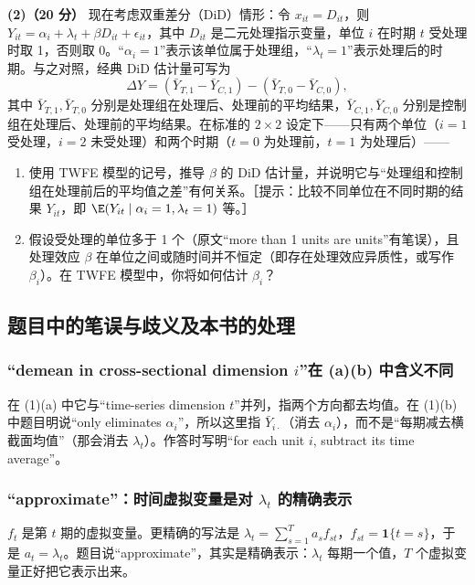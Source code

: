 \textbf{(2)（20 分）} 现在考虑双重差分（DiD）情形：令 $x_{it}=D_{it}$，则 $Y_{it}=\alpha_i+\lambda_t+\beta D_{it}+\epsilon_{it}$，其中 $D_{it}$ 是二元处理指示变量，单位 $i$ 在时期 $t$ 受处理时取 1，否则取 0。“$\alpha_i=1$”表示该单位属于处理组，“$\lambda_t=1$”表示处理后的时期。与之对照，经典 DiD 估计量可写为
\[
\Delta Y=(\bar Y_{T,1}-\bar Y_{C,1})-(\bar Y_{T,0}-\bar Y_{C,0}),
\]
其中 $\bar Y_{T,1},\bar Y_{T,0}$ 分别是处理组在处理后、处理前的平均结果，$\bar Y_{C,1},\bar Y_{C,0}$ 分别是控制组在处理后、处理前的平均结果。在标准的 $2\times2$ 设定下——只有两个单位（$i=1$ 受处理，$i=2$ 未受处理）和两个时期（$t=0$ 为处理前，$t=1$ 为处理后）——
\begin{enumerate}[label=(\alph*)]
  \item 使用 TWFE 模型的记号，推导 $\beta$ 的 DiD 估计量，并说明它与“处理组和控制组在处理前后的平均值之差”有何关系。［提示：比较不同单位在不同时期的结果 $Y_{it}$，即 $\E(Y_{it}\mid\alpha_i=1,\lambda_t=1)$ 等。］
  \item 假设受处理的单位多于 1 个（原文“more than 1 units are units”有笔误），且处理效应 $\beta$ 在单位之间或随时间并不恒定（即存在处理效应异质性，或写作 $\beta_i$）。在 TWFE 模型中，你将如何估计 $\beta_i$？
\end{enumerate}

\subsection{题目中的笔误与歧义及本书的处理}

\subsubsection{“demean in cross-sectional dimension \texorpdfstring{$i$}{i}”在 (a)(b) 中含义不同}
在 (1)(a) 中它与“time-series dimension $t$”并列，指两个方向都去均值。在 (1)(b) 中题目明说“only eliminates $\alpha_i$”，所以这里指 $\bar Y_{i\cdot}$（消去 $\alpha_i$），而不是“每期减去横截面均值”（那会消去 $\lambda_t$）。作答时写明“for each unit $i$, subtract its time average”。

\subsubsection{“approximate”：时间虚拟变量是对 \texorpdfstring{$\lambda_t$}{lambda\_t} 的精确表示}
$f_t$ 是第 $t$ 期的虚拟变量。更精确的写法是 $\lambda_t=\sum_{s=1}^Ta_sf_{st}$，$f_{st}=\mathbf{1}\{t=s\}$，于是 $a_t=\lambda_t$。题目说“approximate”，其实是精确表示：$\lambda_t$ 每期一个值，$T$ 个虚拟变量正好把它表示出来。

